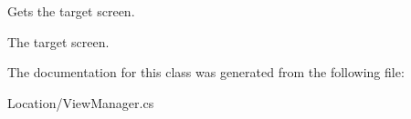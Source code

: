 Gets the target screen. 

The target screen.

The documentation for this class was generated from the following file\-:\begin{DoxyCompactItemize}
\item 
Location/View\-Manager.\-cs\end{DoxyCompactItemize}

